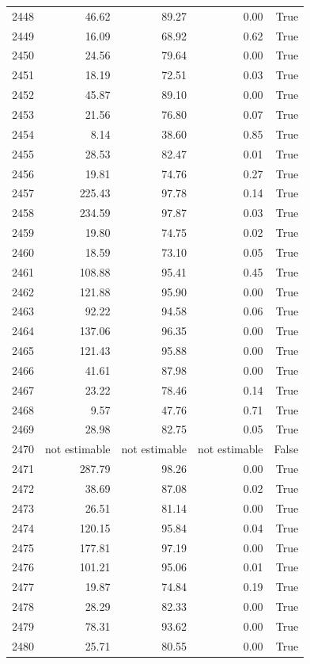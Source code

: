 \begin{longtable}{rrrrr}
2448 & 46.62 & 89.27 & 0.00 & True \\
2449 & 16.09 & 68.92 & 0.62 & True \\
2450 & 24.56 & 79.64 & 0.00 & True \\
2451 & 18.19 & 72.51 & 0.03 & True \\
2452 & 45.87 & 89.10 & 0.00 & True \\
2453 & 21.56 & 76.80 & 0.07 & True \\
2454 & 8.14 & 38.60 & 0.85 & True \\
2455 & 28.53 & 82.47 & 0.01 & True \\
2456 & 19.81 & 74.76 & 0.27 & True \\
2457 & 225.43 & 97.78 & 0.14 & True \\
2458 & 234.59 & 97.87 & 0.03 & True \\
2459 & 19.80 & 74.75 & 0.02 & True \\
2460 & 18.59 & 73.10 & 0.05 & True \\
2461 & 108.88 & 95.41 & 0.45 & True \\
2462 & 121.88 & 95.90 & 0.00 & True \\
2463 & 92.22 & 94.58 & 0.06 & True \\
2464 & 137.06 & 96.35 & 0.00 & True \\
2465 & 121.43 & 95.88 & 0.00 & True \\
2466 & 41.61 & 87.98 & 0.00 & True \\
2467 & 23.22 & 78.46 & 0.14 & True \\
2468 & 9.57 & 47.76 & 0.71 & True \\
2469 & 28.98 & 82.75 & 0.05 & True \\
2470 & not estimable & not estimable & not estimable & False \\
2471 & 287.79 & 98.26 & 0.00 & True \\
2472 & 38.69 & 87.08 & 0.02 & True \\
2473 & 26.51 & 81.14 & 0.00 & True \\
2474 & 120.15 & 95.84 & 0.04 & True \\
2475 & 177.81 & 97.19 & 0.00 & True \\
2476 & 101.21 & 95.06 & 0.01 & True \\
2477 & 19.87 & 74.84 & 0.19 & True \\
2478 & 28.29 & 82.33 & 0.00 & True \\
2479 & 78.31 & 93.62 & 0.00 & True \\
2480 & 25.71 & 80.55 & 0.00 & True \\

\end{longtable}
